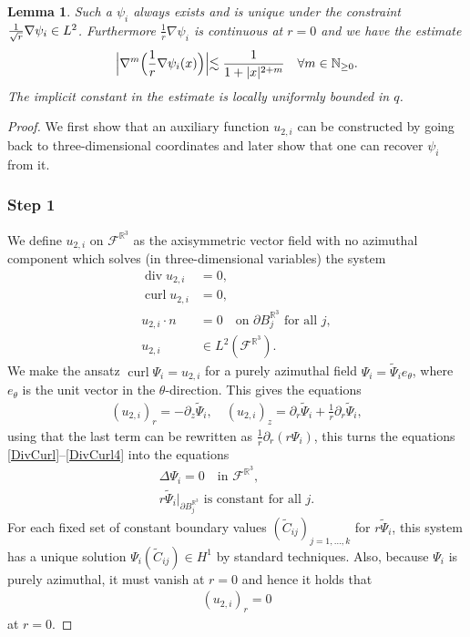 \documentclass[JEP,XML,SOM,Unicode,published]{cedram}
\newtheorem{lemma}[theorem]{Lemma}
\theoremstyle{definition}
\renewcommand{\div}{\operatorname{div}}
\DeclareMathOperator{\curl}{curl}
\newcommand\R{\mathbb{R}}
\newcommand\N{\mathbb{N}}
\newcommand\eq{=}
\let\de\partial
\begin{document}
\endgroup

\begin{lemma}\label{ExistencePsi}
Such a $\psi_i$ always exists and is unique under the constraint $\frac{1}{\sqrt{r}}\nabla\psi_i\in\nobreak L^2$. Furthermore $\frac{1}{r}\nabla\psi_i$ is continuous at $r=0$ and we have the estimate\vspace*{-3pt}
\begin{align*}
\Bigl|\nabla^m\Bigl(\frac{1}{r}\nabla\psi_i(x)\Bigr)\Bigl|\lesssim\frac{1}{1+|x|^{2+m}}\quad \forall m\in\N_{\geq 0}.
\end{align*}
The implicit constant in the estimate is locally uniformly bounded in $q$.
\end{lemma}
\begin{proof}
We first show that an auxiliary function $u_{2,i}$ can be constructed by going back to three-dimensional coordinates and later show that one can recover $\psi_i$ from it.

\subsubsection*{Step 1}
We define $u_{2,i}$ on $\mathcal{F}^{\R^3}$ as the axisymmetric vector field with no azimuthal component which solves (in three-dimensional variables) the system
\begin{align}
\div u_{2,i}&\eq0,\label{DivCurl}\\[-3pt]
 \curl u_{2,i}&\eq0,\label{DivCurl3}\\[-3pt]
 u_{2,i}\cdot n&\eq0\label{DivCurl4}\quad\text{on $\de B_j^{\R^3}$ for all $j$},\\[-3pt]
 u_{2,i}&\in L^2(\mathcal{F}^{\R^3}).\label{DivCurl5}
\end{align}
We make the ansatz $\curl \Psi_i=u_{2,i}$ for a purely azimuthal field $\Psi_i=\tilde{\Psi}_ie_\theta$, where $e_\theta$ is the unit vector in the $\theta$-direction.
This gives the equations
\begin{align*}
(u_{2,i})_r\eq-\de_z\tilde{\Psi}_i,\quad (u_{2,i})_z\eq\de_r\tilde{\Psi}_i+\frac{1}{r}\de_r \tilde{\Psi}_i,
\end{align*}
using that the last term can be rewritten as $\frac{1}{r}\de_r(r\Psi_i)$, this turns the equations \eqref{DivCurl}--\eqref{DivCurl4} into the equations
\begin{gather}
\Delta \Psi_i\eq0\quad\text{in $\mathcal{F}^{\R^3}$},\label{BigPhi1}\\[-3pt]
r\tilde{\Psi}_i|_{\de B_j^{\R^3}}\text{ is constant for all $j$.}\label{BigPhi2}
\end{gather}
For each fixed set of constant boundary values $(\tilde{C}_{ij})_{j=1,\dots,k}$ for $r\tilde{\Psi}_i$, this system has a unique solution $\Psi_i(\tilde{C}_{ij})\in H^1$ by standard techniques. Also, because $\Psi_i$ is purely azimuthal, it must vanish at $r=0$ and hence it holds that\vspace*{-3pt}
\begin{align}\label{u at 0}
(u_{2,i})_r\eq0
\end{align}
at $r=0$.


\end{proof}
\end{document}
